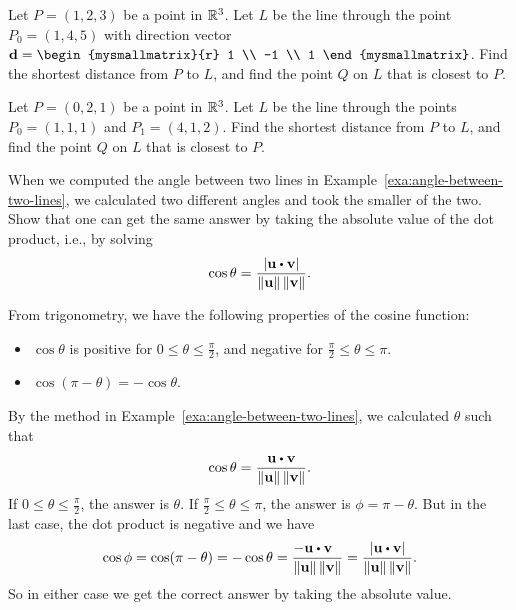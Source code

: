 \begin{ex} Let $P = (1,2,3)$ be a point in $\mathbb{R}^3$. Let $L$ be the line
  through the point $P_0 = (1, 4, 5)$ with direction vector
  $\vect{d} = \begin{mysmallmatrix}{r} 1 \\ -1 \\
    1 \end{mysmallmatrix}$. Find the shortest distance from $P$ to
  $L$, and find the point $Q$ on $L$ that is closest to $P$.
\end{ex}

\begin{ex} Let $P = (0,2,1)$ be a point in $\mathbb{R}^3$. Let $L$ be the line through the points $P_0 = (1, 1, 1)$ and $P_1 = (4, 1, 2)$. Find the shortest distance from $P$ to $L$, and find the point $Q$ on $L$ that is closest to $P$.
\end{ex}

\begin{ex}\label{ex:angle-lines}
  When we computed the angle between two lines in
  Example~\ref{exa:angle-between-two-lines}, we calculated two
  different angles and took the smaller of the two. Show that one can
  get the same answer by taking the absolute value of the dot product,
  i.e., by solving
  \begin{equation*}
    \cos\theta =
    \frac{\abs{\vect{u}\dotprod\vect{v}}}{\norm{\vect{u}}\norm{\vect{v}}}.
  \end{equation*}
  \begin{sol}
    From trigonometry, we have the following properties of the cosine
    function:
    \begin{itemize}
    \item $\cos\theta$ is positive for $0\leq\theta\leq\frac{\pi}{2}$,
      and negative for $\frac{\pi}{2}\leq\theta\leq\pi$.
    \item $\cos(\pi-\theta) = -\cos\theta$.
    \end{itemize}
    By the method in Example~\ref{exa:angle-between-two-lines}, we
    calculated $\theta$ such that
    \begin{equation*}
      \cos\theta =
      \frac{\vect{u}\dotprod\vect{v}}{\norm{\vect{u}}\norm{\vect{v}}}.
    \end{equation*}
    If $0\leq\theta\leq\frac{\pi}{2}$, the answer is $\theta$. If
    $\frac{\pi}{2}\leq\theta\leq\pi$, the answer is $\phi=\pi-\theta$.
    But in the last case, the dot product is negative and we have
    \begin{equation*}
      \cos\phi = \cos(\pi-\theta) = -\cos\theta = \frac{-\vect{u}\dotprod\vect{v}~~}{\norm{\vect{u}}\norm{\vect{v}}}
      =
      \frac{\abs{\vect{u}\dotprod\vect{v}}}{\norm{\vect{u}}\norm{\vect{v}}}.
    \end{equation*}
    So in either case we get the correct answer by taking the absolute
    value.
  \end{sol}
\end{ex}

